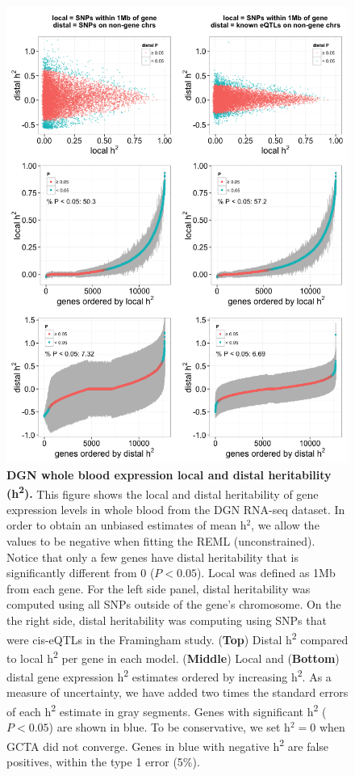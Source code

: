 \documentclass[10pt,letterpaper]{article}
\begin{document}
\begin{figure}[H]
\includegraphics[width=12cm]{Figures/Fig-DGN-jt-h2-UNCONSTRAINED.png}
\caption{{\bf DGN whole blood expression local and distal heritability
(h\textsuperscript{2}).} 
%
This figure shows the local and distal heritability of gene expression levels in whole blood from the DGN RNA-seq dataset. In order to obtain an unbiased estimates of mean h$^2$, we allow the values to be negative when fitting the REML (unconstrained). Notice that only a few genes have distal heritability that is significantly different from 0 ($P<0.05$). 
Local was defined as 1Mb from each gene. For the left side panel, distal heritability was computed using all SNPs outside of the gene's chromosome. On the the right side, distal heritability was computing using SNPs that were cis-eQTLs in the Framingham study.
%
(\textbf{Top}) Distal h\textsuperscript{2} compared to local
h\textsuperscript{2} per gene in each model. (\textbf{Middle}) Local and
(\textbf{Bottom}) distal gene expression h\textsuperscript{2} estimates
ordered by increasing h\textsuperscript{2}. 
As a measure of uncertainty, we have added two times the standard errors of each h\textsuperscript{2} estimate in gray segments. Genes with significant h\textsuperscript{2} ($P<0.05$) are shown in blue.  To be conservative, we set h$^2=0$ when GCTA did not converge. Genes in blue with negative h\textsuperscript{2} are false positives, within the type 1 error (5\%).
}
\label{fig-dgn-jt-h2}
\end{figure}
\end{document}
